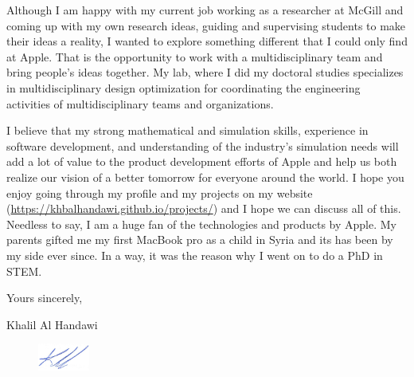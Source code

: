 \documentclass[12pt]{article} %
\begin{document}
\medskip %

Although I am happy with my current job working as a researcher at McGill and coming up with my own research ideas, guiding and supervising students to make their ideas a reality, I wanted to explore something different that I could only find at Apple. That is the opportunity to work with a multidisciplinary team and bring people's ideas together. My lab, where I did my doctoral studies specializes in multidisciplinary design optimization for coordinating the engineering activities of multidisciplinary teams and organizations.

\medskip %

I believe that my strong mathematical and simulation skills, experience in software development, and understanding of the industry's simulation needs will add a lot of value to the product development efforts of Apple and help us both realize our vision of a better tomorrow for everyone around the world. I hope you enjoy going through my profile and my projects on my website (\href{https://khbalhandawi.github.io/projects/}{https://khbalhandawi.github.io/projects/}) and I hope we can discuss all of this. Needless to say, I am a huge fan of the technologies and products by Apple. My parents gifted me my first MacBook pro as a child in Syria and its has been by my side ever since. In a way, it was the reason why I went on to do a PhD in STEM.

\medskip %

Yours sincerely,

\medskip %

Khalil Al Handawi

\begin{figure}[h]
	\includegraphics[width=0.15\textwidth]{Signiture.png}
\end{figure}

\medskip %

\end{document}
